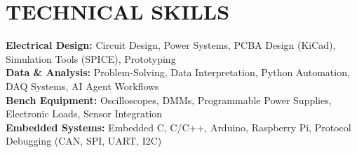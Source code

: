 \documentclass[letterpaper,11pt]{article}
\begin{document}
\section{TECHNICAL SKILLS}
 \begin{itemize}[leftmargin=0.15in, label={}]
    \small{\item{
     \textbf{Electrical Design:} Circuit Design, Power Systems, PCBA Design (KiCad), Simulation Tools (SPICE), Prototyping \\
     \textbf{Data \& Analysis:} Problem-Solving, Data Interpretation, Python Automation, DAQ Systems, AI Agent Workflows \\
     \textbf{Bench Equipment:} Oscilloscopes, DMMs, Programmable Power Supplies, Electronic Loads, Sensor Integration \\
     \textbf{Embedded Systems:} Embedded C, C/C++, Arduino, Raspberry Pi, Protocol Debugging (CAN, SPI, UART, I2C)
    }}
 \end{itemize}


\end{document}
